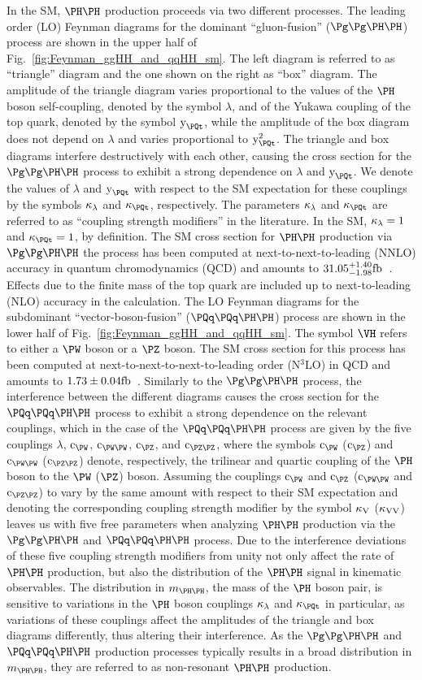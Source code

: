 In the SM, $\HH$ production proceeds via two different processes.
The leading order (LO) Feynman diagrams for the dominant ``gluon-fusion'' ($\ggHH$) process are shown in the upper half of Fig.~\ref{fig:Feynman_ggHH_and_qqHH_sm}.
The left diagram is referred to as ``triangle'' diagram and the one shown on the right as ``box'' diagram.
The amplitude of the triangle diagram varies proportional to the values of the $\PHiggs$ boson self-coupling, denoted by the symbol $\lambda$, 
and of the Yukawa coupling of the top quark, denoted by the symbol $\yt$,
while the amplitude of the box diagram does not depend on $\lambda$ and varies proportional to $\yt^{2}$.
The triangle and box diagrams interfere destructively with each other, 
causing the cross section for the $\ggHH$ process to exhibit a strong dependence on $\lambda$ and $\yt$.
We denote the values of $\lambda$ and $\yt$ with respect to the SM expectation for these couplings by the symbols $\kappa_{\lambda}$ and $\kappat$, respectively.
The parameters $\kappa_{\lambda}$ and $\kappat$ are referred to as ``coupling strength modifiers'' in the literature.
In the SM, $\kappa_{\lambda} = 1$ and $\kappat = 1$, by definition.
The SM cross section for $\HH$ production via $\ggHH$ the process has been computed at next-to-next-to-leading (NNLO) accuracy in quantum chromodynamics (QCD)
and amounts to $31.05^{+1.40}_{-1.98}\text{fb}$~\cite{Grazzini:2018hh}.
Effects due to the finite mass of the top quark are included up to next-to-leading (NLO) accuracy in the calculation.
The LO Feynman diagrams for the subdominant ``vector-boson-fusion'' ($\qqHH$) process are shown in the lower half of Fig.~\ref{fig:Feynman_ggHH_and_qqHH_sm}.
The symbol $\VH$ refers to either a $\PW$ boson or a $\PZ$ boson.
The  SM cross section for this process has been computed at next-to-next-to-next-to-leading order (N$^{3}$LO) in QCD
and amounts to $1.73 \pm 0.04\text{fb}$~\cite{Dreyer:2018qbw}.
Similarly to the $\ggHH$ process, the interference between the different diagrams causes the cross section for the $\qqHH$ process to exhibit a strong dependence on the relevant couplings,
which in the case of the $\qqHH$ process are given by the five couplings $\lambda$, $\cW$, $\cWW$, $\cZ$, and $\cZZ$,
where the symbols $\cW$ ($\cZ$) and $\cWW$ ($\cZZ$) denote, respectively, the trilinear and quartic coupling of the $\PHiggs$ boson to the $\PW$ ($\PZ$) boson.
Assuming the couplings $\cW$ and $\cZ$ ($\cWW$ and $\cZZ$) to vary by the same amount with respect to their SM expectation 
and denoting the corresponding coupling strength modifier by the symbol $\kappa_{\textrm{V}}$ ($\kappa_{\textrm{V}\textrm{V}}$) leaves us with five free parameters
when analyzing $\HH$ production via the $\ggHH$ and $\qqHH$ process.
Due to the interference deviations of these five coupling strength modifiers from unity not only affect the rate of $\HH$ production,
but also the distribution of the $\HH$ signal in kinematic observables.
The distribution in $\mHH$, the mass of the $\PHiggs$ boson pair, is sensitive to variations in the $\PHiggs$ boson couplings $\kappa_{\lambda}$ and $\kappat$ in particular,
as variations of these couplings affect the amplitudes of the triangle and box diagrams differently, thus altering their interference.
As the $\ggHH$ and $\qqHH$ production processes typically results in a broad distribution in $\mHH$,
they are referred to as non-resonant $\HH$ production.

